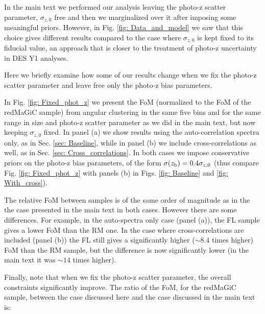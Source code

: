 \documentclass[a4paper,fleqn,usenatbib]{mnras}
\begin{document}
\begin{figure*}
\centering
{}
\caption{lala  }
\label{fig: Fixed_phot_z}
\end{figure*}

In the main text we performed our analysis leaving the photo-z scatter parameter, $\sigma_{z,0}$ free and then we marginalized over it after imposing some meaningful priors. 	However, in Fig. \ref{fig: Data_and_model} we saw that this choice gives different results compared to the case where $\sigma_{z,0}$ is kept fixed to its fiducial value, an approach that is closer to the treatment of photo-z uncertainty in DES Y1 analyses.

Here we briefly examine how some of our results change when we fix the photo-z scatter parameter and leave free only the photo-z bias parameters.

In Fig. \ref{fig: Fixed_phot_z} we present the  FoM  (normalized to the FoM of the redMaGiC sample) from angular clustering in the same five bins and for the same range in size and photo-z scatter parameter as we did in the main text, but now keeping $\sigma_{z,0}$ fixed. In panel (a) we show results using the auto-correlation spectra only, as in Sec. \ref{sec: Baseline}, while in panel (b) we include cross-correlations as well, as in Sec. \ref{sec: Cross_correlations}. In both cases we impose conservative priors  on the photo-z bias parameters, of the form $\sigma(z_{\mbox{\scriptsize{b}}}) = 0.4\sigma_{z,0}$ (thus compare Fig. \ref{fig: Fixed_phot_z} with panels (b) in Figs. \ref{fig: Baseline} and \ref{fig: With_cross}).

The relative FoM between samples is of the same order of magnitude as in the the case presented in the main text in both cases. However there are some differences. For example, in the auto-spectra only case (panel (a)), the FL sample gives a lower FoM than the RM one.  In the case where cross-correlations are included (panel (b)) the FL still gives a significantly higher ($\sim 8.4$ times higher) FoM than the RM sample, but the difference is now significantly lower (in the main text it was $\sim 14 $ times higher).

Finally, note that when we fix the photo-z scatter parameter, the overall constraints significantly improve. The ratio of the FoM, for the redMaGiC sample, between the case discussed here and the case discussed in the main text is:
\end{document}

